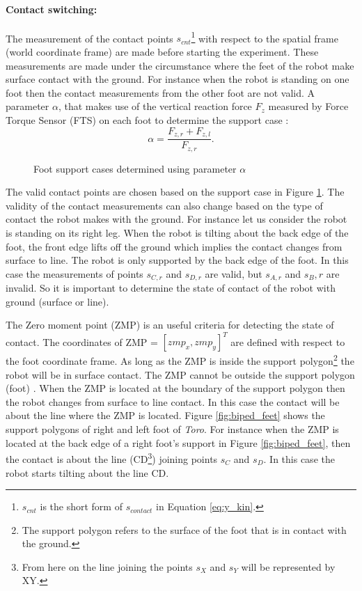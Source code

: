 \paragraph{Contact switching:} The measurement of the contact points $s_{cnt}$\footnote{$s_{cnt}$ is the short form of $s_{contact}$ in Equation \ref{eq:y_kin}.} with respect to the spatial frame (world coordinate frame) are made before starting the experiment. These measurements are made under the circumstance where the feet of the robot make surface contact with the ground. For instance when the robot is standing on one foot then the contact measurements from the other foot are not valid. A parameter $\alpha$, that makes use of the vertical reaction force $F_z$ measured by Force Torque Sensor (FTS) on each foot to determine the support case \citep{atk12}:$$ \alpha = \frac{F_{z,r} + F_{z,l}}{F_{z,r}}.$$ 

\begin{figure}[H]
	
	\caption{Foot support cases determined using parameter $\alpha$}
	\label{fig:support_cases}
\end{figure}

The valid contact points are chosen based on the support case in Figure \ref{fig:support_cases}. The validity of the contact measurements can also change based on the type of contact the robot makes with the ground. For instance let us consider the robot is standing on its right leg. When the robot is tilting about the back edge of the foot, the front edge lifts off the ground which implies the contact changes from surface to line. The robot is only supported by the back edge of the foot. In this case the measurements of points $s_{C,r}$ and $s_{D,r}$ are valid, but $s_{A,r}$ and $s_B,r$ are invalid. So it is important to determine the state of contact of the robot with ground (surface or line). 

The Zero moment point (ZMP) is an useful criteria for detecting the state of contact. The coordinates of ZMP = $[{zmp}_{x},{zmp}_{y}]^T$ are defined with respect to the foot coordinate frame. As long as the ZMP is inside the support polygon\footnote{The support polygon refers to the surface of the foot that is in contact with the ground.} the robot will be in surface contact. The ZMP cannot be outside the support polygon (foot) \citep{mio04}. When the ZMP is located at the boundary of the support polygon then the robot changes from surface to line contact. In this case the contact will be about the line where the ZMP is located. Figure \ref{fig:biped_feet} shows the support polygons of right and left foot of \emph{Toro}. For instance when the ZMP is located at the back edge of a right foot's support in Figure \ref{fig:biped_feet}, then the contact is about the line (CD\footnote{From here on the line joining the points $s_X$ and $s_Y$ will be represented by XY.}) joining points $s_C$ and $s_D$. In this case the robot starts tilting about the line CD.
 
